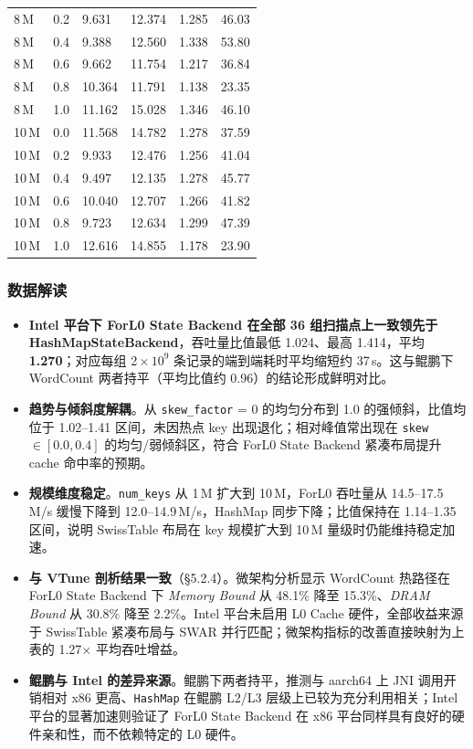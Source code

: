 \documentclass[a4paper,11pt]{article}
\newcommand{\project}{ForL0 State Backend}
\begin{document}
\begin{table}[H]
\begin{tabularx}{\textwidth}{C{1.6cm} C{1.2cm} R{2.2cm} R{2.2cm} R{1.8cm} R{1.8cm}}
8\,M  & 0.2 & 9.631  & 12.374 & 1.285 & 46.03 \\
8\,M  & 0.4 & 9.388  & 12.560 & 1.338 & 53.80 \\
8\,M  & 0.6 & 9.662  & 11.754 & 1.217 & 36.84 \\
8\,M  & 0.8 & 10.364 & 11.791 & 1.138 & 23.35 \\
8\,M  & 1.0 & 11.162 & 15.028 & 1.346 & 46.10 \\
\,M & 0.0 & 11.568 & 14.782 & 1.278 & 37.59 \\
10\,M & 0.2 & 9.933  & 12.476 & 1.256 & 41.04 \\
10\,M & 0.4 & 9.497  & 12.135 & 1.278 & 45.77 \\
10\,M & 0.6 & 10.040 & 12.707 & 1.266 & 41.82 \\
10\,M & 0.8 & 9.723  & 12.634 & 1.299 & 47.39 \\
10\,M & 1.0 & 12.616 & 14.855 & 1.178 & 23.90 \\
\bottomrule
\end{tabularx}
\end{table}

\subsubsection{数据解读}

\begin{itemize}
  \item \textbf{Intel 平台下 \project{} 在全部 36 组扫描点上一致领先于 HashMapStateBackend}，吞吐量比值最低 1.024、最高 1.414，平均 \textbf{1.270}；对应每组 2\,$\times\,10^9$ 条记录的端到端耗时平均缩短约 37\,s。这与鲲鹏下 WordCount 两者持平（平均比值约 0.96）的结论形成鲜明对比。
  \item \textbf{趋势与倾斜度解耦}。从 \texttt{skew\_factor} = 0 的均匀分布到 1.0 的强倾斜，比值均位于 1.02--1.41 区间，未因热点 key 出现退化；相对峰值常出现在 \texttt{skew} $\in [0.0, 0.4]$ 的均匀/弱倾斜区，符合 \project{} 紧凑布局提升 cache 命中率的预期。
  \item \textbf{规模维度稳定}。\texttt{num\_keys} 从 1\,M 扩大到 10\,M，ForL0 吞吐量从 14.5--17.5\,M/s 缓慢下降到 12.0--14.9\,M/s，HashMap 同步下降；比值保持在 1.14--1.35 区间，说明 SwissTable 布局在 key 规模扩大到 10\,M 量级时仍能维持稳定加速。
  \item \textbf{与 VTune 剖析结果一致}（\S5.2.4）。微架构分析显示 WordCount 热路径在 \project{} 下 \emph{Memory Bound} 从 48.1\% 降至 15.3\%、\emph{DRAM Bound} 从 30.8\% 降至 2.2\%。Intel 平台未启用 L0 Cache 硬件，全部收益来源于 SwissTable 紧凑布局与 SWAR 并行匹配；微架构指标的改善直接映射为上表的 1.27$\times$ 平均吞吐增益。
  \item \textbf{鲲鹏与 Intel 的差异来源}。鲲鹏下两者持平，推测与 aarch64 上 JNI 调用开销相对 x86 更高、\texttt{HashMap} 在鲲鹏 L2/L3 层级上已较为充分利用相关；Intel 平台的显著加速则验证了 \project{} 在 x86 平台同样具有良好的硬件亲和性，而不依赖特定的 L0 硬件。
\end{itemize}
\end{document}
